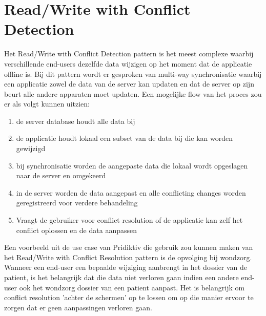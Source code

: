 \section{Read/Write with Conflict Detection}
Het Read/Write with Conflict Detection pattern is het meest complexe waarbij verschillende end-users dezelfde data wijzigen op het moment dat de applicatie offline is. Bij dit pattern wordt er gesproken van multi-way synchronisatie waarbij een applicatie zowel de data van de server kan updaten en dat de server op zijn beurt alle andere apparaten moet updaten. Een mogelijke flow van het proces zou er als volgt kunnen uitzien:
\begin{enumerate}
\item de server database houdt alle data bij
\item de applicatie houdt lokaal een subset van de data bij die kan worden gewijzigd
\item bij synchronisatie worden de aangepaste data die lokaal wordt opgeslagen naar de server en omgekeerd
\item in de server worden de data aangepast en alle conflicting changes worden geregistreerd voor verdere behandeling
\item Vraagt de gebruiker voor conflict resolution of de applicatie kan zelf het conflict oplossen en de data aanpassen
\end{enumerate}
Een voorbeeld uit de use case van Pridiktiv die gebruik zou kunnen maken van het Read/Write with Conflict Resolution pattern is de opvolging bij wondzorg. Wanneer een end-user een bepaalde wijziging aanbrengt in het dossier van de patient, is het belangrijk dat die data niet verloren gaan indien een andere end-user ook het wondzorg dossier van een patient aanpast. Het is belangrijk om conflict resolution 'achter de schermen' op te lossen om op die manier ervoor te zorgen dat er geen aanpassingen verloren gaan.
